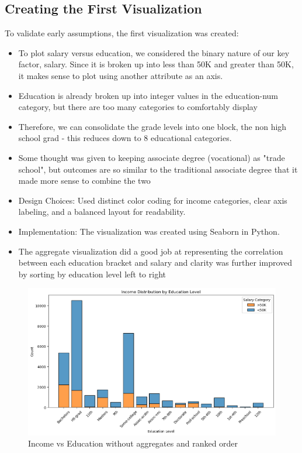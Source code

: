 \documentclass[journal]{IEEEtran}
\begin{document}
\subsection{Creating the First Visualization}
To validate early assumptions, the first visualization was created:
\begin{itemize}
    \item To plot salary versus education, we considered the binary nature of our key factor, salary. Since it is broken up into less than 50K and greater than 50K, it makes sense to plot using another attribute as an axis.
    \item Education is already broken up into integer values in the education-num category, but there are too many categories to comfortably display
    \item Therefore, we can consolidate the grade levels into one block, the non high school grad - this reduces down to 8 educational categories.
    \item Some thought was given to keeping associate degree (vocational) as "trade school", but outcomes are so similar to the traditional associate degree that it made more sense to combine the two
    \item Design Choices: Used distinct color coding for income categories, clear axis labeling, and a balanced layout for readability.
    \item Implementation: The visualization was created using Seaborn in Python.
    \item The aggregate visualization did a good job at representing the correlation between each education bracket and salary and clarity was further improved by sorting by education level left to right
\end{itemize}


\begin{figure}[h]
    \centering
    \includegraphics[width=\columnwidth]{hist_bad.png}  %
    \caption{Income vs Education without aggregates and ranked order}
    \label{fig:Income vs Education without aggregates and order}
\end{figure}
\end{document}
